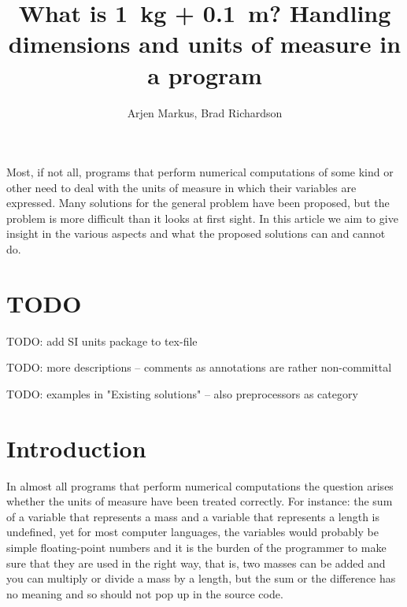 \documentclass{article}
\begin{document}
\title{What is 1~kg + 0.1~m? Handling dimensions and units of measure in a program}

\author{Arjen Markus, Brad Richardson}

\maketitle

\abstract
Most, if not all, programs that perform numerical computations of some kind or other need to deal with
the units of measure in which their variables are expressed. Many solutions for the general problem
have been proposed, but the problem is more difficult than it looks at first sight. In this article we
aim to give insight in the various aspects and what the proposed solutions can and cannot do.


\section{TODO}
TODO: add SI units package to tex-file

TODO: more descriptions -- comments as annotations are rather non-committal

TODO: examples in "Existing solutions" -- also preprocessors as category

\section{Introduction}
In almost all programs that perform numerical computations the question arises whether the units of measure have
been treated correctly. For instance: the sum of a variable that represents a mass and a variable that represents
a length is undefined, yet for most computer languages, the variables would probably be simple floating-point
numbers and it is the burden of the programmer to make sure that they are used in the right way, that is,
two masses can be added and you can multiply or divide a mass by a length, but the sum or the difference has no meaning
and so should not pop up in the source code.
\end{document}

